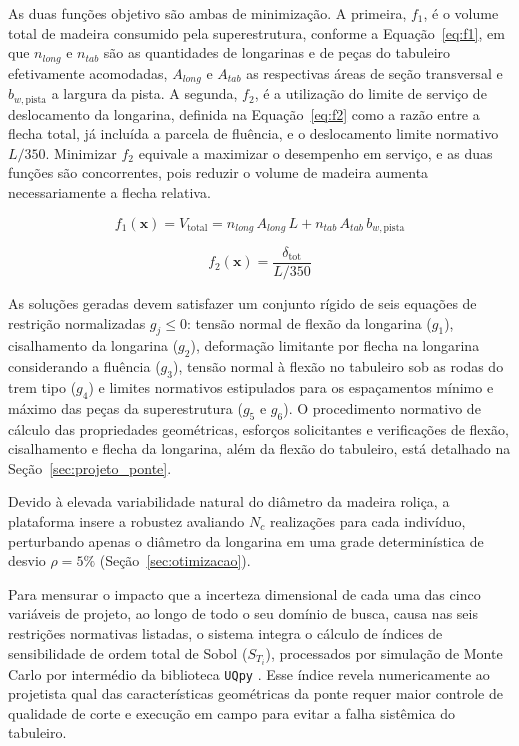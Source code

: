 As duas funções objetivo são ambas de minimização.
A primeira, $f_1$, é o volume total de madeira consumido pela superestrutura, conforme a Equação~\eqref{eq:f1}, em que $n_{long}$ e $n_{tab}$ são as quantidades de longarinas e de peças do tabuleiro efetivamente acomodadas, $A_{long}$ e $A_{tab}$ as respectivas áreas de seção transversal e $b_{w,\mathrm{pista}}$ a largura da pista.
A segunda, $f_2$, é a utilização do limite de serviço de deslocamento da longarina, definida na Equação~\eqref{eq:f2} como a razão entre a flecha total, já incluída a parcela de fluência, e o deslocamento limite normativo $L/350$.
Minimizar $f_2$ equivale a maximizar o desempenho em serviço, e as duas funções são concorrentes, pois reduzir o volume de madeira aumenta necessariamente a flecha relativa.

\begin{equation}
f_1(\mathbf{x}) = V_{\mathrm{total}} = n_{long}\,A_{long}\,L + n_{tab}\,A_{tab}\,b_{w,\mathrm{pista}}
\label{eq:f1}
\end{equation}

\begin{equation}
f_2(\mathbf{x}) = \frac{\delta_{\mathrm{tot}}}{L/350}
\label{eq:f2}
\end{equation}

As soluções geradas devem satisfazer um conjunto rígido de seis equações de restrição normalizadas $g_j \leq 0$: tensão normal de flexão da longarina ($g_1$), cisalhamento da longarina ($g_2$), deformação limitante por flecha na longarina considerando a fluência ($g_3$), tensão normal à flexão no tabuleiro sob as rodas do trem tipo ($g_4$) e limites normativos estipulados para os espaçamentos mínimo e máximo das peças da superestrutura ($g_5$ e $g_6$).
O procedimento normativo de cálculo das propriedades geométricas, esforços solicitantes e verificações de flexão, cisalhamento e flecha da longarina, além da flexão do tabuleiro, está detalhado na Seção~\ref{sec:projeto_ponte}.

Devido à elevada variabilidade natural do diâmetro da madeira roliça, a plataforma insere a robustez avaliando $N_c$ realizações para cada indivíduo, perturbando apenas o diâmetro da longarina em uma grade determinística de desvio $\rho = 5\%$ (Seção~\ref{sec:otimizacao}).

Para mensurar o impacto que a incerteza dimensional de cada uma das cinco variáveis de projeto, ao longo de todo o seu domínio de busca, causa nas seis restrições normativas listadas, o sistema integra o cálculo de índices de sensibilidade de ordem total de Sobol ($S_{T_i}$), processados por simulação de Monte Carlo por intermédio da biblioteca \texttt{UQpy} \parencite{Olivier2020}.
Esse índice revela numericamente ao projetista qual das características geométricas da ponte requer maior controle de qualidade de corte e execução em campo para evitar a falha sistêmica do tabuleiro.


